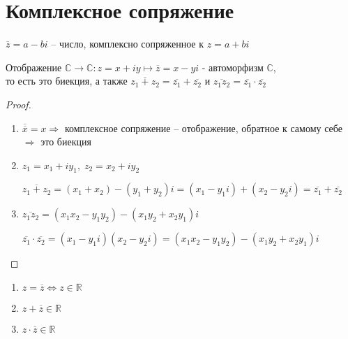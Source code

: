 
\section{Комплексное сопряжение}
$\overline{z} = a - bi$ -- число, комплексно сопряженное к $z = a + bi$
\begin{theorem-non}
    Отображение $\mathbb{C} \to \mathbb{C} : z = x + iy \mapsto \overline{z} = x - yi$ - автоморфизм $\mathbb{C}$, \\
    то есть это биекция, а также $\overline{z_1 + z_2} = \overline{z_1} + \overline{z_2}$ и $\overline{z_1z_2} = \overline{z_1} \cdot \overline{z_2}$
\end{theorem-non}
\begin{proof}
    \begin{enumerate}
    \item $\overline{\overline{x}} = x \Rightarrow$ комплексное сопряжение -- отображение, обратное к самому себе $\Rightarrow$ это биекция
    \item  $z_1 = x_1 + iy_1,\; z_2 = x_2 + iy_2$ 
    
    $\overline{z_1 + z_2} = (x_1 + x_2) - (y_1 + y_2)i = (x_1 - y_1i) + (x_2 - y_2i) = \overline{z_1} + \overline{z_2}$
    \item $\overline{z_1z_2} = (x_1x_2 - y_1y_2) - (x_1y_2 + x_2y_1)i$
    
    $\overline{z_1} \cdot \overline{z_2} = (x_1 - y_1i)(x_2 - y_2i) = (x_1x_2 - y_1y_2) - (x_1y_2 + x_2y_1)i$
    \end{enumerate}
\end{proof}
\begin{notice}
    \begin{enumerate}
    \item $z = \overline{z} \Leftrightarrow z \in \mathbb{R}$
    \item $z + \overline{z} \in \mathbb{R}$
    \item $z \cdot \overline{z} \in \mathbb{R}$
    \end{enumerate}
\end{notice}